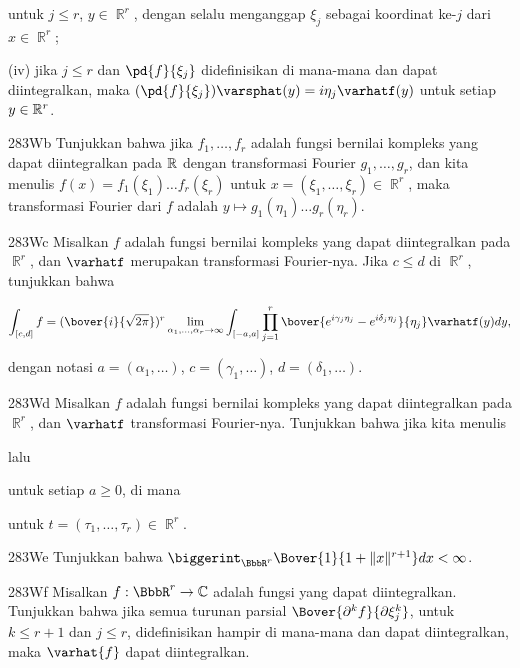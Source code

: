 {\noindent untuk $j\le r$, $y\in\BbbR^r$, dengan selalu menganggap $\xi_j$
sebagai koordinat ke-$j$ dari $x\in\BbbR^r$;

\quad (iv) jika $j\le r$ dan $\pd{f}{\xi_j}$ didefinisikan di mana-mana dan
dapat diintegralkan, maka
$(\pd{f}{\xi_j})\varsphat(y)=i\eta_j\varhatf(y)$
untuk setiap $y\in\Bbb R^r$.   

\spheader 283Wb Tunjukkan bahwa jika $f_1,\ldots,f_r$ adalah fungsi bernilai kompleks
yang dapat diintegralkan pada $\Bbb R$ dengan transformasi Fourier
$g_1,\ldots,g_r$, dan kita menulis $f(x)=f_1(\xi_1)\ldots f_r(\xi_r)$ untuk
$x=(\xi_1,\ldots,\xi_r)\in\BbbR^r$, maka transformasi Fourier dari $f$
adalah $y\mapsto g_1(\eta_1)\ldots g_r(\eta_r)$.

\spheader 283Wc Misalkan $f$ adalah fungsi bernilai kompleks yang dapat diintegralkan
pada $\BbbR^r$, dan $\varhatf$ merupakan transformasi Fourier-nya.   Jika $c\le d$ di
$\BbbR^r$, tunjukkan bahwa

$$\int_{[c,d]}f
=(\bover{i}{\sqrt{2\pi}})^r
\lim_{\alpha_1,\ldots,\alpha_r\to\infty}
\int_{[-a,a]}\prod_{j=1}^r
\bover{e^{i\gamma_j\eta_j}-e^{i\delta_j\eta_j}}{\eta_j}\varhatf(y)dy,$$

\noindent dengan notasi $a=(\alpha_1,\ldots)$, $c=(\gamma_1,\ldots)$,
$d=(\delta_1,\ldots)$.

\spheader 283Wd
Misalkan $f$ adalah fungsi bernilai kompleks yang dapat diintegralkan pada $\BbbR^r$, dan
$\varhatf$ transformasi Fourier-nya.   Tunjukkan bahwa jika kita menulis


\noindent lalu


\noindent untuk setiap $a\ge 0$, di mana


\noindent untuk $t=(\tau_1,\ldots,\tau_r)\in\BbbR^r$.

\spheader 283We Tunjukkan bahwa
$\biggerint_{\BbbR^r}\Bover{1}{1+\|x\|^{r+1}}dx<\infty$.

\spheader 283Wf Misalkan $f:\BbbR^r\to\Bbb C$ adalah fungsi yang dapat diintegralkan.
Tunjukkan bahwa jika semua turunan parsial
$\Bover{\partial^kf}{\partial\xi_j^k}$, untuk $k\le r+1$ dan
$j\le r$, didefinisikan hampir di mana-mana dan dapat diintegralkan,
maka $\varhat{f}$ dapat diintegralkan.

}
